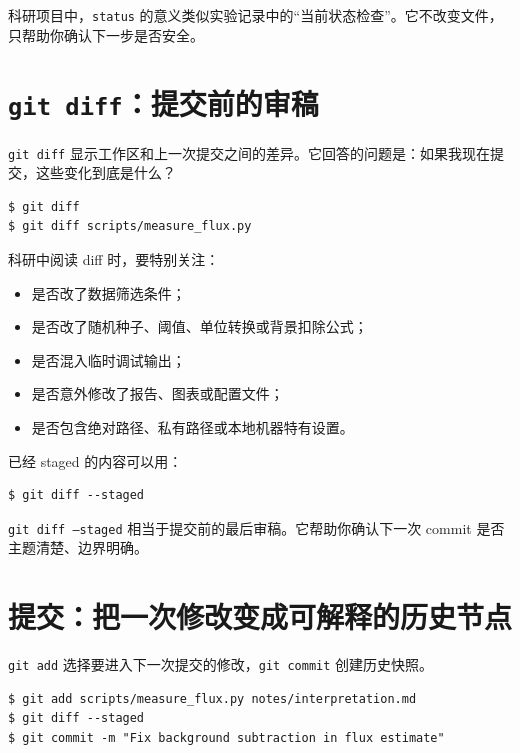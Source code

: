 科研项目中，\texttt{status} 的意义类似实验记录中的“当前状态检查”。它不改变文件，只帮助你确认下一步是否安全。

\section{\texttt{git diff}：提交前的审稿}

\texttt{git diff} 显示工作区和上一次提交之间的差异。它回答的问题是：如果我现在提交，这些变化到底是什么？

\begin{examplebox}[查看差异]
\begin{lstlisting}[style=terminal]
$ git diff
$ git diff scripts/measure_flux.py
\end{lstlisting}
\end{examplebox}

科研中阅读 diff 时，要特别关注：

\begin{itemize}
    \item 是否改了数据筛选条件；
    \item 是否改了随机种子、阈值、单位转换或背景扣除公式；
    \item 是否混入临时调试输出；
    \item 是否意外修改了报告、图表或配置文件；
    \item 是否包含绝对路径、私有路径或本地机器特有设置。
\end{itemize}

已经 staged 的内容可以用：

\begin{examplebox}[查看将要提交的差异]
\begin{lstlisting}[style=terminal]
$ git diff --staged
\end{lstlisting}
\end{examplebox}

\texttt{git diff --staged} 相当于提交前的最后审稿。它帮助你确认下一次 commit 是否主题清楚、边界明确。

\section{提交：把一次修改变成可解释的历史节点}

\texttt{git add} 选择要进入下一次提交的修改，\texttt{git commit} 创建历史快照。

\begin{examplebox}[一次主题清楚的提交]
\begin{lstlisting}[style=terminal]
$ git add scripts/measure_flux.py notes/interpretation.md
$ git diff --staged
$ git commit -m "Fix background subtraction in flux estimate"
\end{lstlisting}
\end{examplebox}

